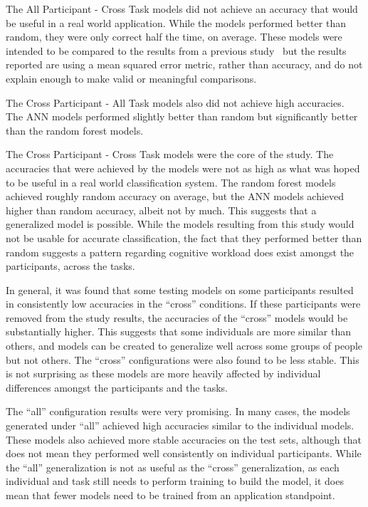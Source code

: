 \documentclass[11pt]{article}
\begin{document}
	The All Participant - Cross Task models did not achieve an accuracy that would be useful in a real world application. While the models performed better than random, they were only correct half the time, on average. These models were intended to be compared to the results from a previous study~\cite{Ke} but the results reported are using a mean squared error metric, rather than accuracy, and do not explain enough to make valid or meaningful comparisons. 
	
	The Cross Participant - All Task models also did not achieve high accuracies. The ANN models performed slightly better than random but significantly better than the random forest models. 
	
	The Cross Participant - Cross Task models were the core of the study. The accuracies that were achieved by the models were not as high as what was hoped to be useful in a real world classification system. The random forest models achieved roughly random accuracy on average, but the ANN models achieved higher than random accuracy, albeit not by much. This suggests that a generalized model is possible. While the models resulting from this study would not be usable for accurate classification, the fact that they performed better than random suggests a pattern regarding cognitive workload does exist amongst the participants, across the tasks. 
	
	In general, it was found that some testing models on some participants resulted in consistently low accuracies in the ``cross'' conditions. If these participants were removed from the study results, the accuracies of the ``cross'' models would be substantially higher. This suggests that some individuals are more similar than others, and models can be created to generalize well across some groups of people but not others. The ``cross'' configurations were also found to be less stable. This is not surprising as these models are more heavily affected by individual differences amongst the participants and the tasks. 
	
	The ``all'' configuration results were very promising. In many cases, the models generated under ``all'' achieved high accuracies similar to the individual models. These models also achieved more stable accuracies on the test sets, although that does not mean they performed well consistently on individual participants. While the ``all'' generalization is not as useful as the ``cross'' generalization, as each individual and task still needs to perform training to build the model, it does mean that fewer models need to be trained from an application standpoint.
		
\end{document}
